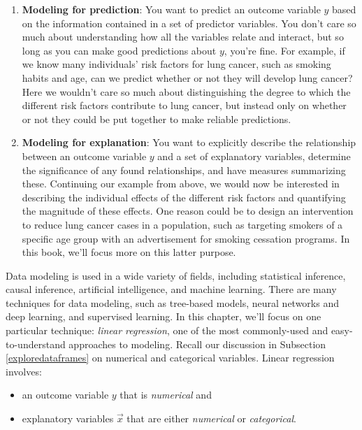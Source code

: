 \documentclass[12pt,]{krantz}
\providecommand{\tightlist}{%
  \setlength{\itemsep}{0pt}\setlength{\parskip}{0pt}}
\begin{document}
\begin{enumerate}
\def\labelenumi{\arabic{enumi}.}
\tightlist
\item
  \textbf{Modeling for prediction}: You want to predict an outcome
  variable \(y\) based on the information contained in a set of
  predictor variables. You don't care so much about understanding how
  all the variables relate and interact, but so long as you can make
  good predictions about \(y\), you're fine. For example, if we know
  many individuals' risk factors for lung cancer, such as smoking habits
  and age, can we predict whether or not they will develop lung cancer?
  Here we wouldn't care so much about distinguishing the degree to which
  the different risk factors contribute to lung cancer, but instead only
  on whether or not they could be put together to make reliable
  predictions.
\item
  \textbf{Modeling for explanation}: You want to explicitly describe the
  relationship between an outcome variable \(y\) and a set of
  explanatory variables, determine the significance of any found
  relationships, and have measures summarizing these. Continuing our
  example from above, we would now be interested in describing the
  individual effects of the different risk factors and quantifying the
  magnitude of these effects. One reason could be to design an
  intervention to reduce lung cancer cases in a population, such as
  targeting smokers of a specific age group with an advertisement for
  smoking cessation programs. In this book, we'll focus more on this
  latter purpose.
\end{enumerate}

Data modeling is used in a wide variety of fields, including statistical
inference, causal inference, artificial intelligence, and machine
learning. There are many techniques for data modeling, such as
tree-based models, neural networks and deep learning, and supervised
learning. In this chapter, we'll focus on one particular technique:
\emph{linear regression}, one of the most commonly-used and
easy-to-understand approaches to modeling. Recall our discussion in
Subsection \ref{exploredataframes} on numerical and categorical
variables. Linear regression involves:

\begin{itemize}
\tightlist
\item
  an outcome variable \(y\) that is \emph{numerical} and
\item
  explanatory variables \(\vec{x}\) that are either \emph{numerical} or
  \emph{categorical}.
\end{itemize}
\end{document}
